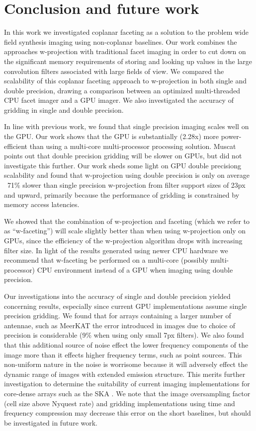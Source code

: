 \chapter{Conclusion and future work}
In this work we investigated coplanar faceting as a solution to the problem wide field synthesis imaging using non-coplanar baselines.
Our work combines the approaches w-projection with traditional facet imaging in order to cut down on the significant memory requirements of 
storing and looking up values in the large convolution filters associated with large fields of view. We compared the scalability of this coplanar
faceting approach to w-projection in both single and double precision, drawing a comparison between an optimized multi-threaded CPU facet imager and a 
GPU imager. We also investigated the accuracy of gridding in single and double precision.

In line with previous work, we found that single precision imaging scales well on the GPU. Our work shows that the GPU is substantially (2.28x) more 
power-efficient than using a multi-core multi-processor processing solution. Muscat \cite{muscat2014high} points out that double precision 
gridding will be slower on GPUs, but did not investigate this further. Our work sheds some light on GPU double precisiong scalability and found that w-projection
using double precision is only on average ~71\% slower than single precision w-projection from filter support sizes of 23px and upward, primarily because 
the performance of gridding is constrained by memory access latencies. 

We showed that the combination of w-projection and faceting (which we refer to as ``w-faceting'') will scale slightly better than when using w-projection only on GPUs, 
since the efficiency of the w-projection algorithm drops with increasing filter size. In light of the results generated using newer CPU hardware we recommend that w-faceting be
performed on a multi-core (possibly multi-processor) CPU environment instead of a GPU when imaging using double precision.

Our investigations into the accuracy of single and double precision yielded concerning results, especially since current GPU implementations assume single precision gridding. We found
that for arrays containing a larger number of antennae, such as MeerKAT the error introduced in images due to choice of precision is considerable (9\% when using only small 7px filters). 
We also found that this additional source of noise effect the lower frequency components of the image more than it effects higher frequency terms, such as point sources. This 
non-uniform nature in the noise is worrisome because it will adversely effect the dynamic range of images with extended emission structure. This merits further investigation
to determine the suitability of current imaging implementations for core-dense arrays such as the SKA \cite{skaconfig}. We note that the image oversampling factor 
(cell size above Nyquest rate) and gridding implementations using time and frequency compression may decrease this error on the short baselines, but should be investigated 
in future work.

